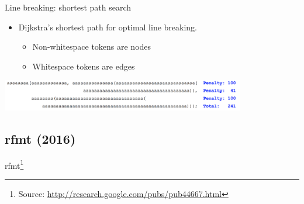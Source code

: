 \documentclass[xcolor=dvipsnames]{beamer}
\theoremstyle{definition}
\begin{document}
\begin{frame}{Line breaking: shortest path search}
  \begin{itemize}
    \item Dijkstra's shortest path for optimal line breaking.
      \begin{itemize}
        \item Non-whitespace tokens are nodes
        \item Whitespace tokens are edges
      \end{itemize}
  \end{itemize}
  \begin{center}
    \includegraphics[width=0.8\textwidth]{img/dijkstra.png}
  \end{center}
\end{frame}

\subsection{rfmt (2016)}
\begin{frame}{}
  \begin{center}
    \Huge rfmt\footnote{Source: \url{http://research.google.com/pubs/pub44667.html}}
  \end{center}
\end{frame}
\end{document}

